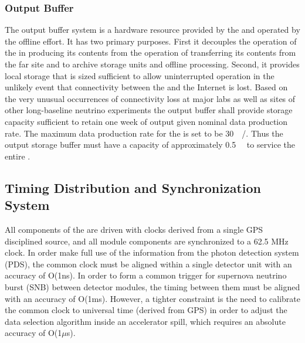 
\subsubsection{Output Buffer}


The output buffer system is a hardware resource provided by the  and operated by the  offline effort. 
It has two primary purposes. 
First it decouples the operation of the  in producing its contents from the operation of transferring its contents from the far site and to archive storage units and offline processing. 
Second, it provides local storage that is sized sufficient to allow uninterrupted  operation in the unlikely event that connectivity between the  and the Internet is lost. 
Based on the very unusual occurrences of connectivity loss at major labs as well as  sites of other long-baseline neutrino experiments the output buffer shall provide storage capacity sufficient to retain one week of output given nominal data production rate. 
The maximum data production rate for the  is set to be \SI{30}{\peta\byte/\year}. 
Thus the output storage buffer must have a capacity of approximately \SI{0.5}{\peta\byte} to service the entire .




\subsection{Timing Distribution and Synchronization System}
\label{sec:sp-daq:design-timing}

All components of the  are driven with clocks derived
from a single GPS disciplined source, and all module components
are synchronized to a 62.5 MHz clock. In order make full use of the
information from the photon detection system (PDS), the common clock
must be aligned within a single detector unit with an accuracy of
O(1ns). In order to form a common trigger for supernova neutrino burst
(SNB) between detector modules, the timing between them must be
aligned with an accuracy of O(1ms). However, a tighter constraint is
the need to calibrate the common clock to universal time (derived from
GPS) in order to adjust the data selection algorithm inside an
accelerator spill, which requires an absolute accuracy of O(1$\mu$s).

